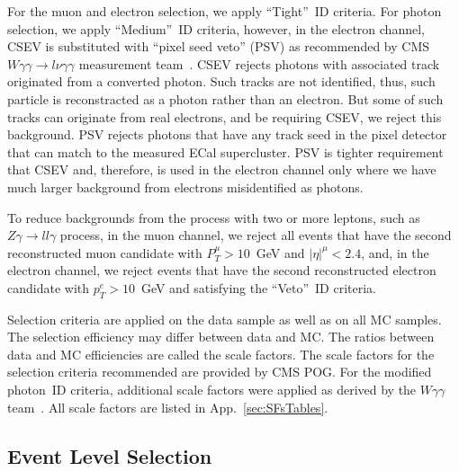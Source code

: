 
For the muon and electron selection, we apply ``Tight''~ID criteria. For photon selection, we apply ``Medium''~ID criteria, however, in the electron channel, CSEV is substituted with ``pixel seed veto'' (PSV) as recommended by CMS $W\gamma\gamma \rightarrow l\nu\gamma\gamma$ measurement team~\cite{ref_Wgg8TeV}. CSEV rejects photons with associated track originated from a converted photon. Such tracks are not identified, thus, such particle is reconstracted as a photon rather than an electron. But some of such tracks can originate from real electrons, and be requiring CSEV, we reject this background. PSV rejects photons that have any track seed in the pixel detector that can match to the measured ECal supercluster. PSV is tighter requirement that CSEV and, therefore, is used in the electron channel only where we have much larger background from electrons misidentified as photons. %

To reduce backgrounds from the process with two or more leptons, such as $Z\gamma\rightarrow l l \gamma$ process, in the muon channel, we reject all events that have the second reconstructed muon candidate with $P_T^{\mu}>10$~GeV and $|\eta|^{\mu}<2.4$, and, in the electron channel, we reject events that have the second reconstructed electron candidate with $p_T^e>10$~GeV and satisfying the ``Veto''~ID criteria.

Selection criteria are applied on the data sample as well as on all MC samples. The selection efficiency may differ between data and MC. The ratios between data and MC efficiencies are called the scale factors. The scale factors for the selection criteria recommended are provided by CMS POG. For the modified photon~ID criteria, additional scale factors were applied as derived by the $W\gamma\gamma$ team~\cite{ref_Wgg8TeV}. All scale factors are listed in App.~\ref{sec:SFsTables}.

\subsection{Event Level Selection}
\label{sec:AN_Selection_EventLevel}

